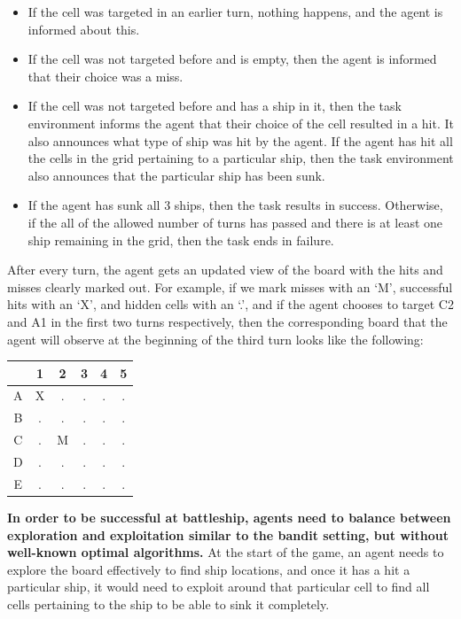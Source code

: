 \documentclass{article}
\theoremstyle{plain}
\theoremstyle{definition}
\theoremstyle{remark}
\begin{document}
\begin{itemize}
    \item If the cell was targeted in an earlier turn, nothing happens, and the agent is informed about this.
    \item If the cell was not targeted before and is empty, then the agent is informed that their choice was a miss.
    \item If the cell was not targeted before and has a ship in it, then the task environment informs the agent that their choice of the cell resulted in a hit. It also announces what type of ship was hit by the agent. If the agent has hit all the cells in the grid pertaining to a particular ship, then the task environment also announces that the particular ship has been sunk.
    \item If the agent has sunk all 3 ships, then the task results in success. Otherwise, if the all of the allowed number of turns has passed and there is at least one ship remaining in the grid, then the task ends in failure.
\end{itemize}
After every turn, the agent gets an updated view of the board with the hits and misses clearly marked out. For example, if we mark misses with an `M', successful hits with an `X', and hidden cells with an `.', and if the agent chooses to target C2 and A1 in the first two turns respectively, then the corresponding board that the agent will observe at the beginning of the third turn looks like the following:
\begin{table}[h]
\centering
\begin{tabular}{|c|c|c|c|c|c|}
\hline
& 1 & 2 & 3 & 4 & 5 \\
\hline
A & X & . & . & . & . \\
\hline
B & . & . & . & . & . \\
\hline
C & . & M & . & . & . \\
\hline
D & . & . & . & .  & . \\
\hline
E & . & . & . & . & . \\
\hline
\end{tabular}
\end{table}
\textbf{In order to be successful at battleship, agents need to balance between exploration and exploitation similar to the bandit setting, but without well-known optimal algorithms.} At the start of the game, an agent needs to explore the board effectively to find ship locations, and once it has a hit a particular ship, it would need to exploit around that particular cell to find all cells pertaining to the ship to be able to sink it completely.
\end{document}
